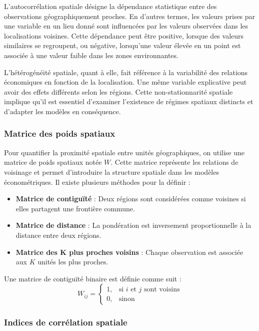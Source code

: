 \documentclass[
]{article}
\begin{document}
L'autocorrélation spatiale désigne la dépendance statistique entre des
observations géographiquement proches. En d'autres termes, les valeurs
prises par une variable en un lieu donné sont influencées par les
valeurs observées dans les localisations voisines. Cette dépendance peut
être positive, lorsque des valeurs similaires se regroupent, ou
négative, lorsqu'une valeur élevée en un point est associée à une valeur
faible dans les zones environnantes.

L'hétérogénéité spatiale, quant à elle, fait référence à la variabilité
des relations économiques en fonction de la localisation. Une même
variable explicative peut avoir des effets différents selon les régions.
Cette non-stationnarité spatiale implique qu'il est essentiel d'examiner
l'existence de régimes spatiaux distincts et d'adapter les modèles en
conséquence.

\subsubsection{Matrice des poids
spatiaux}\label{matrice-des-poids-spatiaux}

Pour quantifier la proximité spatiale entre unités géographiques, on
utilise une matrice de poids spatiaux notée \(W\). Cette matrice
représente les relations de voisinage et permet d'introduire la
structure spatiale dans les modèles économétriques. Il existe plusieurs
méthodes pour la définir :

\begin{itemize}
\item \textbf{Matrice de contiguïté} : Deux régions sont considérées comme voisines si elles partagent une frontière commune.
\item \textbf{Matrice de distance} : La pondération est inversement proportionnelle à la distance entre deux régions.
\item \textbf{Matrice des K plus proches voisins} : Chaque observation est associée aux $K$ unités les plus proches.
\end{itemize}

Une matrice de contiguïté binaire est définie comme suit : \[
W_{ij} = \begin{cases} 
1, & \text{si } i \text{ et } j \text{ sont voisins} \\
0, & \text{sinon} 
\end{cases}
\]

\subsubsection{Indices de corrélation
spatiale}\label{indices-de-corruxe9lation-spatiale}
\end{document}
